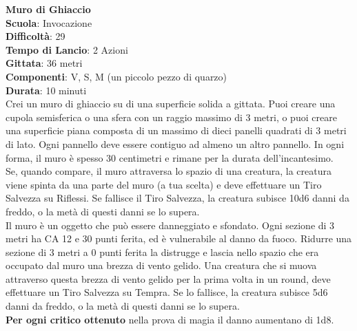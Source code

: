 \begin{multicols}{2}
\medskip\textbf{Muro di Ghiaccio}\\
\textbf{Scuola}: Invocazione\\
\textbf{Difficoltà}: 29\\
\textbf{Tempo di Lancio}: 2 Azioni\\
\textbf{Gittata}: 36 metri\\
\textbf{Componenti}: V, S, M (un piccolo pezzo di quarzo)\\
\textbf{Durata}: 10 minuti\\
Crei un muro di ghiaccio su di una superficie solida a gittata. Puoi creare una cupola semisferica o una sfera con un raggio massimo di 3 metri, o puoi creare una superficie piana composta di un massimo di dieci panelli quadrati di 3 metri di lato. Ogni pannello deve essere contiguo ad almeno un altro pannello. In ogni forma, il muro è spesso 30 centimetri e rimane per la durata dell'incantesimo. \\
Se, quando compare, il muro attraversa lo spazio di una creatura, la creatura viene spinta da una parte del muro (a tua scelta) e deve effettuare un Tiro Salvezza su Riflessi. Se fallisce il Tiro Salvezza, la creatura subisce 10d6 danni da freddo, o la metà di questi danni se lo supera.\\
Il muro è un oggetto che può essere danneggiato e sfondato. Ogni sezione di 3 metri ha CA 12 e 30 punti ferita, ed è vulnerabile al danno da fuoco. Ridurre una sezione di 3 metri a 0 punti ferita la distrugge e lascia nello spazio che era occupato dal muro una brezza di vento gelido. Una creatura che si muova attraverso questa brezza di vento gelido per la prima volta in un round, deve effettuare un Tiro Salvezza su Tempra. Se lo fallisce, la creatura subisce 5d6 danni da freddo, o la metà di questi danni se lo supera.\\
\textbf{Per ogni critico ottenuto} nella prova di magia il danno aumentano di 1d8.


\end{multicols}
